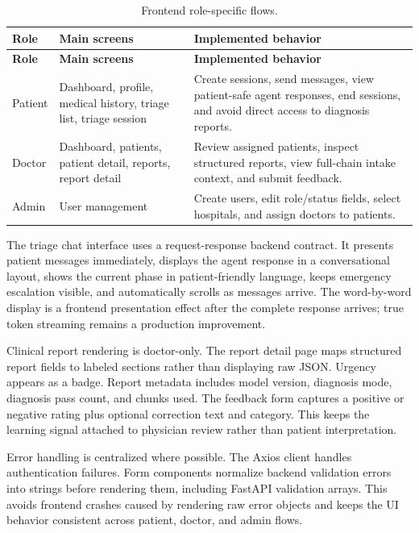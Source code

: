 \begin{longtable}{p{} p{} p{}}
\caption{Frontend role-specific flows.}
\label{tab:frontend_role_flows}\\
\toprule
\textbf{Role} & \textbf{Main screens} & \textbf{Implemented behavior}\\
\midrule
\endfirsthead
\toprule
\textbf{Role} & \textbf{Main screens} & \textbf{Implemented behavior}\\
\midrule
\endhead
Patient & Dashboard, profile, medical history, triage list, triage session & Create sessions, send messages, view patient-safe agent responses, end sessions, and avoid direct access to diagnosis reports.\\
Doctor & Dashboard, patients, patient detail, reports, report detail & Review assigned patients, inspect structured reports, view full-chain intake context, and submit feedback.\\
Admin & User management & Create users, edit role/status fields, select hospitals, and assign doctors to patients.\\
\bottomrule
\end{longtable}

The triage chat interface uses a request-response backend contract. It presents patient messages immediately, displays the agent response in a conversational layout, shows the current phase in patient-friendly language, keeps emergency escalation visible, and automatically scrolls as messages arrive. The word-by-word display is a frontend presentation effect after the complete response arrives; true token streaming remains a production improvement.

Clinical report rendering is doctor-only. The report detail page maps structured report fields to labeled sections rather than displaying raw JSON. Urgency appears as a badge. Report metadata includes model version, diagnosis mode, diagnosis pass count, and chunks used. The feedback form captures a positive or negative rating plus optional correction text and category. This keeps the learning signal attached to physician review rather than patient interpretation.

Error handling is centralized where possible. The Axios client handles authentication failures. Form components normalize backend validation errors into strings before rendering them, including FastAPI validation arrays. This avoids frontend crashes caused by rendering raw error objects and keeps the UI behavior consistent across patient, doctor, and admin flows.

